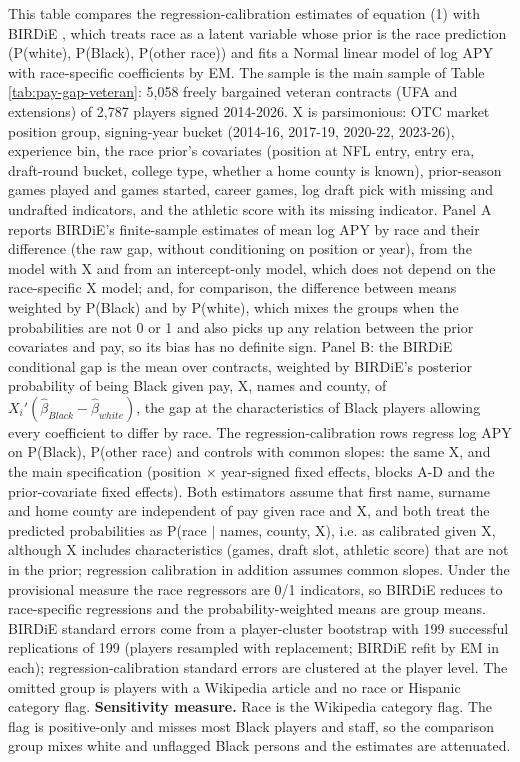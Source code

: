 \begin{table}[!h]
\begin{threeparttable}
\begin{tablenotes}[para]
\item This table compares the regression-calibration estimates of equation (1) with BIRDiE \citep{mccartan2025birdie}, which treats race as a latent variable whose prior is the race prediction (P(white), P(Black), P(other race)) and fits a Normal linear model of log APY with race-specific coefficients by EM. The sample is the main sample of Table \ref{tab:pay-gap-veteran}: 5,058 freely bargained veteran contracts (UFA and extensions) of 2,787 players signed 2014-2026. X is parsimonious: OTC market position group, signing-year bucket (2014-16, 2017-19, 2020-22, 2023-26), experience bin, the race prior's covariates (position at NFL entry, entry era, draft-round bucket, college type, whether a home county is known), prior-season games played and games started, career games, log draft pick with missing and undrafted indicators, and the athletic score with its missing indicator. Panel A reports BIRDiE's finite-sample estimates of mean log APY by race and their difference (the raw gap, without conditioning on position or year), from the model with X and from an intercept-only model, which does not depend on the race-specific X model; and, for comparison, the difference between means weighted by P(Black) and by P(white), which mixes the groups when the probabilities are not 0 or 1 and also picks up any relation between the prior covariates and pay, so its bias has no definite sign. Panel B: the BIRDiE conditional gap is the mean over contracts, weighted by BIRDiE's posterior probability of being Black given pay, X, names and county, of $X_i'(\hat\beta_{Black} - \hat\beta_{white})$, the gap at the characteristics of Black players allowing every coefficient to differ by race. The regression-calibration rows regress log APY on P(Black), P(other race) and controls with common slopes: the same X, and the main specification (position $\times$ year-signed fixed effects, blocks A-D and the prior-covariate fixed effects). Both estimators assume that first name, surname and home county are independent of pay given race and X, and both treat the predicted probabilities as P(race $|$ names, county, X), i.e. as calibrated given X, although X includes characteristics (games, draft slot, athletic score) that are not in the prior; regression calibration in addition assumes common slopes. Under the provisional measure the race regressors are 0/1 indicators, so BIRDiE reduces to race-specific regressions and the probability-weighted means are group means. BIRDiE standard errors come from a player-cluster bootstrap with 199 successful replications of 199 (players resampled with replacement; BIRDiE refit by EM in each); regression-calibration standard errors are clustered at the player level. The omitted group is players with a Wikipedia article and no race or Hispanic category flag. \textbf{Sensitivity measure.} Race is the Wikipedia category flag. The flag is positive-only and misses most Black players and staff, so the comparison group mixes white and unflagged Black persons and the estimates are attenuated.
\end{tablenotes}
\end{threeparttable}
\end{table}

